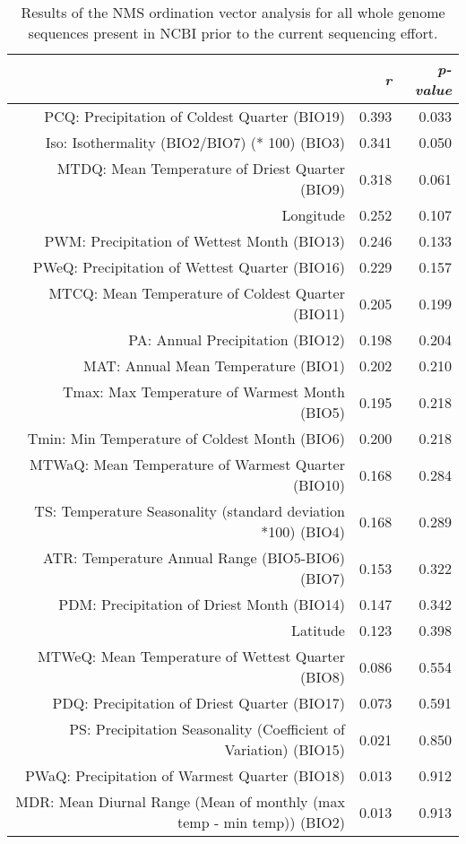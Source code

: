 \begin{table}[ht]
\centering
\begin{tabular}{rrr}
  \hline
 & {\emph{r}} & {\emph{p-value}} \\ 
  \hline
PCQ: Precipitation of Coldest Quarter (BIO19) & 0.393 & 0.033 \\ 
  Iso: Isothermality (BIO2/BIO7) (* 100) (BIO3) & 0.341 & 0.050 \\ 
  MTDQ: Mean Temperature of Driest Quarter (BIO9) & 0.318 & 0.061 \\ 
  Longitude & 0.252 & 0.107 \\ 
  PWM: Precipitation of Wettest Month (BIO13) & 0.246 & 0.133 \\ 
  PWeQ: Precipitation of Wettest Quarter (BIO16) & 0.229 & 0.157 \\ 
  MTCQ: Mean Temperature of Coldest Quarter (BIO11) & 0.205 & 0.199 \\ 
  PA: Annual Precipitation (BIO12) & 0.198 & 0.204 \\ 
  MAT: Annual Mean Temperature (BIO1) & 0.202 & 0.210 \\ 
  Tmax: Max Temperature of Warmest Month (BIO5) & 0.195 & 0.218 \\ 
  Tmin: Min Temperature of Coldest Month (BIO6) & 0.200 & 0.218 \\ 
  MTWaQ: Mean Temperature of Warmest Quarter (BIO10) & 0.168 & 0.284 \\ 
  TS: Temperature Seasonality (standard deviation *100) (BIO4) & 0.168 & 0.289 \\ 
  ATR: Temperature Annual Range (BIO5-BIO6) (BIO7) & 0.153 & 0.322 \\ 
  PDM: Precipitation of Driest Month (BIO14) & 0.147 & 0.342 \\ 
  Latitude & 0.123 & 0.398 \\ 
  MTWeQ: Mean Temperature of Wettest Quarter (BIO8) & 0.086 & 0.554 \\ 
  PDQ: Precipitation of Driest Quarter (BIO17) & 0.073 & 0.591 \\ 
  PS: Precipitation Seasonality (Coefficient of Variation) (BIO15) & 0.021 & 0.850 \\ 
  PWaQ: Precipitation of Warmest Quarter (BIO18) & 0.013 & 0.912 \\ 
  MDR: Mean Diurnal Range (Mean of monthly (max temp - min temp)) (BIO2) & 0.013 & 0.913 \\ 
   \hline
\end{tabular}
\caption{Results of the NMS ordination vector analysis for all whole genome sequences present in NCBI prior to the current sequencing effort.} 
\label{tab:wc_napg_vec}
\end{table}
